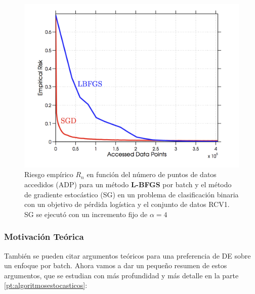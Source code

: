 \begin{figure}[h]
	\centering
	\includegraphics[scale=.3]{gfx/de.png}
	\caption{Riesgo empírico $R_n$ en función del número de puntos de datos accedidos (ADP) para un método \textbf{L-BFGS} por batch y el método de gradiente estocástico (SG) en un problema de clasificación binaria con un objetivo de pérdida logística y el conjunto de datos RCV1. SG se ejecutó con un incremento fijo de $\alpha  = 4$}
	\label{gfx: de}
\end{figure}

\subsubsection{Motivación Teórica }

También se pueden citar argumentos teóricos para una preferencia de DE sobre un enfoque por batch. Ahora vamos a dar un peque\~no resumen de estos argumentos, que se estudian con m\'as profundidad y m\'as detalle en la parte \ref{pt:algoritmosestocasticos}:

